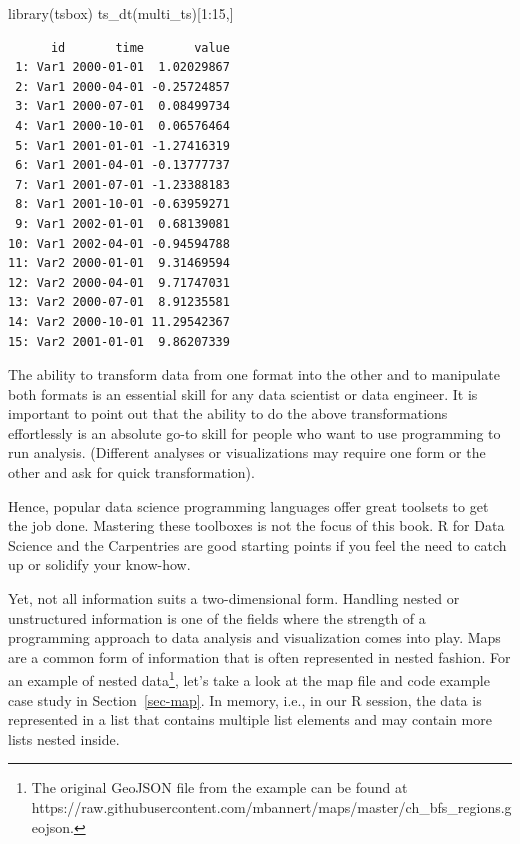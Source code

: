 \documentclass[
  12pt,
  letterpaper,
]{krantz}
\newenvironment{Shaded}{\begin{snugshade}}{\end{snugshade}}
\newcommand{\DecValTok}[1]{\textcolor[rgb]{0.68,0.00,0.00}{#1}}
\newcommand{\FunctionTok}[1]{\textcolor[rgb]{0.28,0.35,0.67}{#1}}
\newcommand{\NormalTok}[1]{\textcolor[rgb]{0.00,0.23,0.31}{#1}}
\newcommand{\SpecialCharTok}[1]{\textcolor[rgb]{0.37,0.37,0.37}{#1}}
\begin{document}
\normalsize

\begin{Shaded}
\begin{Highlighting}[]
\FunctionTok{library}\NormalTok{(tsbox)}
\FunctionTok{ts\_dt}\NormalTok{(multi\_ts)[}\DecValTok{1}\SpecialCharTok{:}\DecValTok{15}\NormalTok{,]}
\end{Highlighting}
\end{Shaded}

\begin{verbatim}
      id       time       value
 1: Var1 2000-01-01  1.02029867
 2: Var1 2000-04-01 -0.25724857
 3: Var1 2000-07-01  0.08499734
 4: Var1 2000-10-01  0.06576464
 5: Var1 2001-01-01 -1.27416319
 6: Var1 2001-04-01 -0.13777737
 7: Var1 2001-07-01 -1.23388183
 8: Var1 2001-10-01 -0.63959271
 9: Var1 2002-01-01  0.68139081
10: Var1 2002-04-01 -0.94594788
11: Var2 2000-01-01  9.31469594
12: Var2 2000-04-01  9.71747031
13: Var2 2000-07-01  8.91235581
14: Var2 2000-10-01 11.29542367
15: Var2 2001-01-01  9.86207339
\end{verbatim}

\normalsize

The ability to transform data from one format into the other and to
manipulate both formats is an essential skill for any data scientist or
data engineer. It is important to point out that the ability to do the
above transformations effortlessly is an absolute go-to skill for people
who want to use programming to run analysis. (Different analyses or
visualizations may require one form or the other and ask for quick
transformation).

Hence, popular data science programming languages offer great toolsets
to get the job done. Mastering these toolboxes is not the focus of this
book. R for Data Science and the Carpentries are good starting points if
you feel the need to catch up or solidify your know-how.

Yet, not all information suits a two-dimensional form. Handling
nested or unstructured information is one of the
fields where the strength of a programming approach to data analysis and
visualization comes into play. Maps are a common form of information
that is often represented in nested fashion. For an
example of nested data\footnote{The original GeoJSON file from the
  example can be found at
  https://raw.githubusercontent.com/mbannert/maps/master/ch\_bfs\_regions.geojson.},
let's take a look at the map file and code example case study in
Section~\ref{sec-map}. In memory, i.e., in our R session, the data is
represented in a list that contains multiple list elements and may
contain more lists nested inside.
\end{document}
